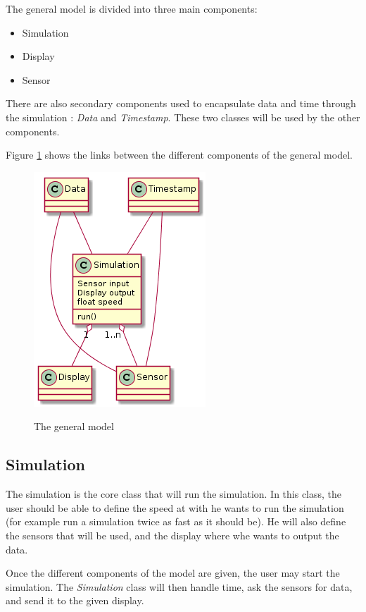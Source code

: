 

The general model is divided into three main components:
\begin{itemize}
\item Simulation
\item Display
\item Sensor
\end{itemize}

There are also secondary components used to encapsulate data and time through
the simulation : \emph{Data} and \emph{Timestamp}. These two classes will be
used by the other components.

Figure \ref{meta-meta-model} shows the links between the different components
of the general model.

\begin{figure}
  \centering
  \includegraphics[scale = 0.5]{figures/meta-meta-model.png}
  \label{meta-meta-model}
  \caption{The general model}
\end{figure}

\subsection{Simulation}

The simulation is the core class that will run the simulation. In this class,
the user should be able to define the speed at with he wants to run the
simulation (for example run a simulation twice as fast as it should be). He
will also define the sensors that will be used, and the display where whe wants
to output the data.

Once the different components of the model are given, the user may start the
simulation. The \emph{Simulation} class will then handle time, ask the sensors
for data, and send it to the given display.

